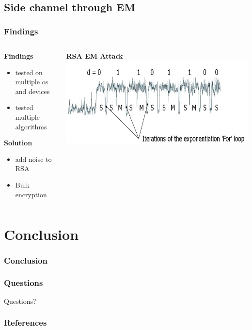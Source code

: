 \documentclass{beamer}
\begin{document}
	\subsection{Side channel through EM}
		
		\begin{frame}
		\frametitle{Findings}
		\begin{columns}[T]
		\begin{column}{.45\textwidth}
		\textbf{Findings}
		\begin{itemize}
		\item tested on multiple os and devices
		\item tested multiple algorithms
		\end{itemize}
		\textbf{Solution}
		\begin{itemize}
		\item add noise to RSA
		\item Bulk encryption
		\end{itemize}
		 
		
		\end{column}
		\begin{column}{.45\textwidth}
		\textbf{RSA EM Attack}
		\includegraphics[scale=.3]{Images/RSA.jpg}
		\end{column}
		\end{columns}
	
		
			
		\end{frame}
\section{Conclusion}
	\begin{frame}
		\frametitle{Conclusion}
		\end{frame}	
		
		\begin{frame}
		\frametitle{Questions}
			\begin{center}
			\Huge Questions?
			\end{center}
		\end{frame}	
		\begin{frame}
		\frametitle{References}
		\end{frame}
\end{document}
